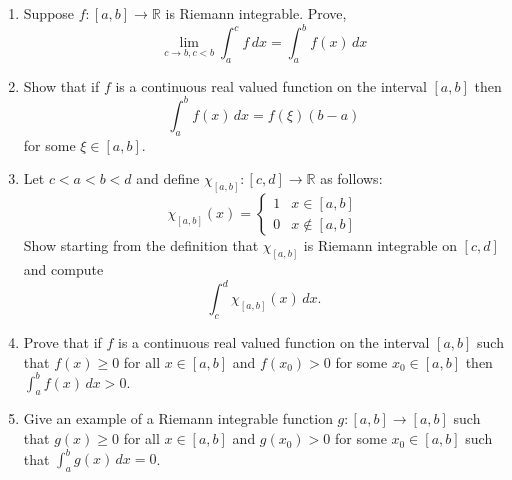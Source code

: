 \documentclass[12pt,letterpaper]{article}
\theoremstyle{plain}
\theoremstyle{definition}
\begin{document}
\begin{enumerate}[1.]
\item Suppose $f:[a,b]\rightarrow \mathbb{R}$ is Riemann integrable. Prove,
\[\lim_{c\rightarrow b, c<b}\int_a^c f\, dx=\int_a^b f(x)\, dx\]
\item Show that if $f$ is a continuous real valued function on the interval $[a,b]$ then 
\[\int_a^b f(x)\, dx = f(\xi) (b-a)\]
for some $\xi\in [a,b]$.
\item Let $c<a<b<d$ and define  $\chi_{[a,b]}:[c,d]\rightarrow \mathbb{R}$ as follows:
\[\chi_{[a,b]}(x)=\left\{\begin{array}{lr}1 & x\in [a,b]\\ 0 & x\not\in [a,b]\end{array}\right.\]
Show starting from the definition that $\chi_{[a,b]}$ is Riemann integrable on $[c,d]$ and compute 
\[\int_c^d \chi_[a,b](x) \, dx.\]
\item Prove that if $f$ is a continuous real valued function on the interval $[a,b]$ such that $f(x)\geq 0$ for all $x\in [a,b]$ and $f(x_0)>0$ for some $x_0\in [a,b]$ then $\int_a^b f(x)\, dx>0$. 
\item Give an example of a Riemann integrable function $g:[a,b]\rightarrow [a,b]$ such that $g(x)\geq 0$ for all $x\in [a,b]$ and $g(x_0)>0$ for some $x_0\in [a,b]$ such that $\int_a^b g(x)\, dx=0$.
\end{enumerate}
\end{document}
